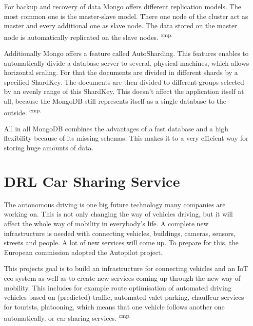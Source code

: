 
For backup and recovery of data Mongo offers different replication models. The most common one is the master-slave model. There one node of the cluster act as master and every additional one as slave node. The data stored on the master node is automatically replicated on the slave nodes. \textsuperscript{cmp.\cite{33}}

Additionally Mongo offers a feature called AutoSharding. This features enables to automatically divide a database server to several, physical machines, which allows horizontal scaling. For that the documents are divided in different shards by a specified ShardKey. The documents are then divided to different groups selected by an evenly range of this ShardKey. This doesn't affect the application itself at all, because the MongoDB still represents itself as a single database to the outside.  \textsuperscript{cmp.\cite{33}}

All in all MongoDB combines the advantages of a fast database and a high flexibility because of its missing schemas. This makes it to a very efficient way for storing huge amounts of data.

\section{DRL Car Sharing Service}

The autonomous driving is one big future technology many companies are working on. This is not only changing the way of vehicles driving, but it will affect the whole way of mobility in everybody's life. A complete new infrastructure is needed with connecting vehicles, buildings, cameras, sensors, streets and people. A lot of new services will come up. To prepare for this, the European commission adopted the Autopilot project.

This projects goal is to build an infrastructure for connecting vehicles and an IoT eco system as well as to create new services coming up through the new way of mobility. This includes for example route optimisation of automated driving vehicles based on (predicted) traffic, automated valet parking, chauffeur services for tourists, platooning, which means that one vehicle follows another one automatically, or car sharing services.  \textsuperscript{cmp.\cite{37}}

